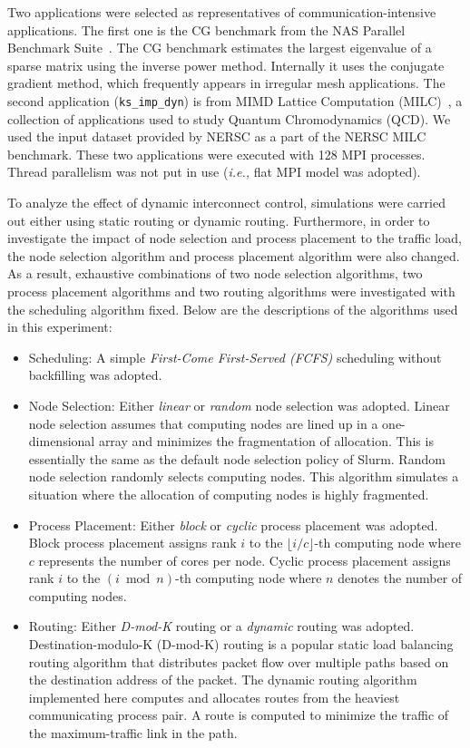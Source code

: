 Two applications were selected as representatives of
communication-intensive applications. The first one is the CG benchmark
from the NAS Parallel Benchmark Suite~\autocite{Bailey1991}. The CG
benchmark estimates the largest eigenvalue of a sparse matrix using the
inverse power method. Internally it uses the conjugate gradient method,
which frequently appears in irregular mesh applications. The second
application (\lstinline!ks_imp_dyn!) is from MIMD
Lattice Computation (MILC)~\autocite{milc}, a collection of applications
used to study Quantum Chromodynamics (QCD). We used the input dataset
provided by NERSC as a part of the NERSC MILC benchmark. These two
applications were executed with 128 MPI processes. Thread parallelism
was not put in use (\emph{i.e.,} flat MPI model was adopted).

To analyze the effect of dynamic interconnect control, simulations were
carried out either using static routing or dynamic routing. Furthermore,
in order to investigate the impact of node selection and process
placement to the traffic load, the node selection algorithm and process
placement algorithm were also changed. As a result, exhaustive
combinations of two node selection algorithms, two process placement
algorithms and two routing algorithms were investigated with the
scheduling algorithm fixed. Below are the descriptions of the algorithms
used in this experiment:

\begin{itemize}
\item
  Scheduling: A simple \emph{First-Come First-Served (FCFS)} scheduling
  without backfilling was adopted.
\item
  Node Selection: Either \emph{linear} or \emph{random} node selection
  was adopted. Linear node selection assumes that computing nodes are
  lined up in a one-dimensional array and minimizes the fragmentation of
  allocation. This is essentially the same as the default node selection
  policy of Slurm. Random node selection randomly selects computing
  nodes. This algorithm simulates a situation where the allocation of
  computing nodes is highly fragmented.
\item
  Process Placement: Either \emph{block} or \emph{cyclic} process
  placement was adopted. Block process placement assigns rank \(i\) to
  the \(\lfloor i / c \rfloor\)-th computing node where \(c\) represents
  the number of cores per node. Cyclic process placement assigns rank
  \(i\) to the \((i \bmod n)\)-th computing node where \(n\) denotes the
  number of computing nodes.
\item
  Routing: Either \emph{D-mod-K} routing or a \emph{dynamic} routing was
  adopted. \mbox{Destination-modulo-K} (\mbox{D-mod-K}) routing is a
  popular static load balancing routing algorithm that distributes
  packet flow over multiple paths based on the destination address of
  the packet. The dynamic routing algorithm implemented here computes
  and allocates routes from the heaviest communicating process pair. A
  route is computed to minimize the traffic of the maximum-traffic link
  in the path.
\end{itemize}

